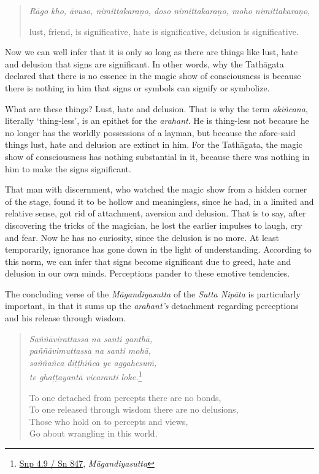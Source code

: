 \begin{quote}
\emph{Rāgo kho, āvuso, nimittakaraṇo, doso nimittakaraṇo, moho nimittakaraṇo},

lust, friend, is significative, hate is significative, delusion is significative.
\end{quote}

Now we can well infer that it is only so long as there are things like lust, hate and delusion that signs are significant. In other words, why the Tathāgata declared that there is no essence in the magic show of consciousness is because there is nothing in him that signs or symbols can signify or symbolize.

What are these things? Lust, hate and delusion. That is why the term \emph{akiñcana}, literally `thing-less', is an epithet for the \emph{arahant}. He is thing-less not because he no longer has the worldly possessions of a layman, but because the afore-said things lust, hate and delusion are extinct in him. For the Tathāgata, the magic show of consciousness has nothing substantial in it, because there was nothing in him to make the signs significant.

That man with discernment, who watched the magic show from a hidden corner of the stage, found it to be hollow and meaningless, since he had, in a limited and relative sense, got rid of attachment, aversion and delusion. That is to say, after discovering the tricks of the magician, he lost the earlier impulses to laugh, cry and fear. Now he has no curiosity, since the delusion is no more. At least temporarily, ignorance has gone down in the light of understanding. According to this norm, we can infer that signs become significant due to greed, hate and delusion in our own minds. Perceptions pander to these emotive tendencies.

The concluding verse of the \emph{Māgandiyasutta} of the \emph{Sutta Nipāta} is particularly important, in that it sums up the \emph{arahant's} detachment regarding perceptions and his release through wisdom.

\begin{quote}
\emph{Saññāvirattassa na santi ganthā,}\\
\emph{paññāvimuttassa na santi mohā,}\\
\emph{saññañca diṭṭhiñca ye aggahesuṁ,}\\
\emph{te ghaṭṭayantā vicaranti loke.}\footnote{\href{https://suttacentral.net/snp4.9/pli/ms}{Snp 4.9 / Sn 847}, \emph{Māgandiyasutta}}

To one detached from percepts there are no bonds,\\
To one released through wisdom there are no delusions,\\
Those who hold on to percepts and views,\\
Go about wrangling in this world.
\end{quote}

